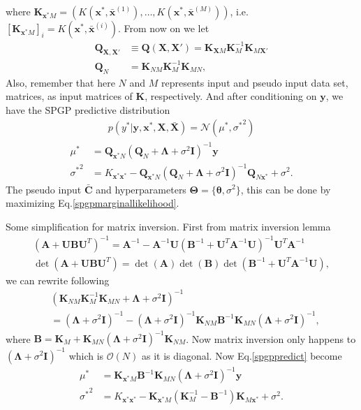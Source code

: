 \documentclass[10pt,a4paper]{article}
\begin{document}
where $\pmb{K}_{\pmb{x}^*M}=(K(\pmb{x}^*,\bar{\pmb{x}}^{(1)}),\dots,K(\pmb{x}^*,\bar{\pmb{x}}^{(M)}))$, i.e. $[\pmb{K}_{\pmb{x}^*M}]_{i}=K(\pmb{x}^*,\bar{\pmb{x}}^{(i)})$. From now on we let 
\begin{align}
\pmb{Q}_{\pmb{X},\pmb{X}'}&\equiv\pmb{Q}(\pmb{X},\pmb{X}')=\pmb{K}_{\pmb{X}M}\pmb{K}_{M}^{-1}\pmb{K}_{M\pmb{X}'}\\
\pmb{Q}_N&=\pmb{K}_{NM}\pmb{K}_{M}^{-1}\pmb{K}_{MN},
\end{align}
Also, remember that here $N$ and $M$ represents input and pseudo input data set, matrices, as input matrices of $\pmb{K}$, respectively.
And after conditioning on $\pmb{y}$, we have the SPGP predictive distribution
\begin{align}
p(y^*|\pmb{y},\pmb{x}^*,\pmb{X},\bar{\pmb{X}})=\mathcal{N}(\mu^*,{\sigma^*}^2)
\end{align}
\begin{equation}
\begin{aligned}
\mu^*&=\pmb{Q}_{\pmb{x}^*N}(\pmb{Q}_N+\pmb{\Lambda}+\sigma^2\pmb{I})^{-1}\pmb{y}\\
{\sigma^*}^2&=K_{\pmb{x}^*\pmb{x}^*}-\pmb{Q}_{\pmb{x}^*N}(\pmb{Q}_N+\pmb{\Lambda}+\sigma^2\pmb{I})^{-1}\pmb{Q}_{N\pmb{x}^*}+\sigma^2.
\end{aligned}
\label{spgppredict}
\end{equation}
The pseudo input $\bar{\pmb{C}}$ and hyperparameters $\pmb{\Theta}=\lbrace\pmb{\theta},\sigma^2\rbrace$, this can be done by maximizing Eq.\ref{spgpmarginallikelihood}.

Some simplification for matrix inversion. First from matrix inversion lemma
\begin{align}
(\pmb{A}+\pmb{U}\pmb{B}\pmb{U}^T)^{-1}=\pmb{A}^{-1}-\pmb{A}^{-1}\pmb{U}(\pmb{B}^{-1}+\pmb{U}^T\pmb{A}^{-1}\pmb{U})^{-1}\pmb{U}^T\pmb{A}^{-1}\\
\det(\pmb{A}+\pmb{U}\pmb{B}\pmb{U}^T)=\det(\pmb{A})\det(\pmb{B})\det(\pmb{B}^{-1}+\pmb{U}^T\pmb{A}^{-1}\pmb{U}),
\end{align}
we can rewrite following
\begin{align}
&(\pmb{K}_{NM}\pmb{K}_{M}^{-1}\pmb{K}_{MN}+\pmb{\Lambda}+\sigma^2\pmb{I})^{-1}\\
&=(\pmb{\Lambda}+\sigma^2\pmb{I})^{-1}-(\pmb{\Lambda}+\sigma^2\pmb{I})^{-1}\pmb{K}_{NM}\pmb{B}^{-1}\pmb{K}_{MN}(\pmb{\Lambda}+\sigma^2\pmb{I})^{-1},
\end{align}
where $\pmb{B}=\pmb{K}_M+\pmb{K}_{MN}(\pmb{\Lambda}+\sigma^2\pmb{I})^{-1}\pmb{K}_{NM}$. Now matrix inversion only happens to $(\pmb{\Lambda}+\sigma^2\pmb{I})^{-1}$ which is $\mathcal{O}(N)$ as it is diagonal. Now Eq.\ref{spgppredict} become
\begin{equation}
\begin{aligned}
\mu^*&=\pmb{K}_{\pmb{x}^*M}\pmb{B}^{-1}\pmb{K}_{MN}(\pmb{\Lambda}+\sigma^2\pmb{I})^{-1}\pmb{y}\\
{\sigma^*}^2&=K_{\pmb{x}^*\pmb{x}^*}-\pmb{K}_{\pmb{x}^*M}(\pmb{K}_M^{-1}-\pmb{B}^{-1})\pmb{K}_{M\pmb{x}^*}+\sigma^2.
\end{aligned}
\label{spgppredictsim}
\end{equation}
\end{document}
